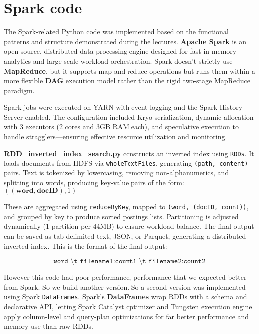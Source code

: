 \section{Spark code}
The Spark-related Python code was implemented based on the functional patterns and structure demonstrated during the lectures. \textbf{Apache Spark} is an open-source, distributed data processing engine designed for fast in-memory analytics and large-scale workload orchestration. Spark doesn’t strictly use \textbf{MapReduce}, but it supports map and reduce operations but runs them within a more flexible \textbf{DAG} execution model rather than the rigid two-stage MapReduce paradigm.

\vspace{4mm}

Spark jobs were executed on YARN with event logging and the Spark History Server enabled. The configuration included Kryo serialization, dynamic allocation with 3 executors (2 cores and 3GB RAM each), and speculative execution to handle stragglers—ensuring effective resource utilization and monitoring.

\vspace{4mm}

\textbf{RDD\_inverted\_index\_search.py} constructs an inverted index using \texttt{RDDs}. It loads documents from HDFS via \texttt{wholeTextFiles}, generating \texttt{(path, content)} pairs. Text is tokenized by lowercasing, removing non-alphanumerics, and splitting into words, producing key-value pairs of the form: $ ((\textbf{word}, \textbf{docID}), 1) $

These are aggregated using \texttt{reduceByKey}, mapped to \texttt{(word, (docID, count))}, and grouped by key to produce sorted postings lists. Partitioning is adjusted dynamically (1 partition per 44MB) to ensure workload balance. The final output can be saved as tab-delimited text, JSON, or Parquet, generating a distributed inverted index. This is the format of the final output:

\[
\texttt{word \textbackslash t filename1:count1 \textbackslash t filename2:count2}
\]

However this code had poor performance, performance that we expected better from Spark. So we build another version. So a second version was implemented using Spark \texttt{DataFrames}. Spark's \textbf{DataFrames} wrap RDDs with a schema and declarative API, letting Spark Catalyst optimizer and Tungsten execution engine apply column-level and query-plan optimizations for far better performance and memory use than raw RDDs. 

